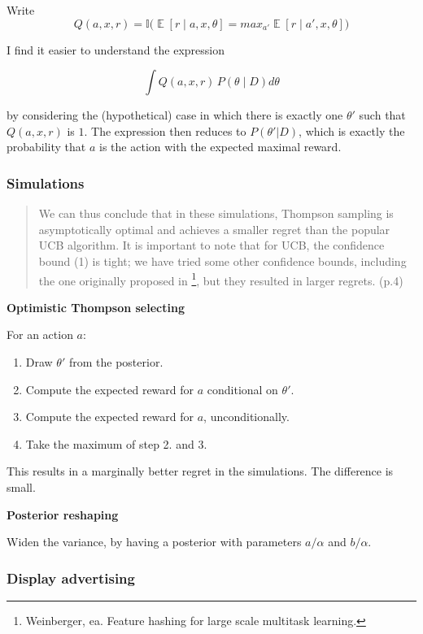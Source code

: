 \documentclass[11pt]{article}
\newcommand{\E}[1]{\operatorname{\mathbb{E}}[#1]}
\begin{document}
Write
\[
Q(a, x, r) = \mathbb{I}\Big(\E{r \mid a, x, \theta} = max_{a'} \E{r \mid a', x, \theta}\Big)
\]

I find it easier to understand the expression

\[
\int Q(a, x, r) \, P(\theta \mid D) d\theta
\]

by considering the (hypothetical) case in which there is exactly one $\theta'$
such that $Q(a, x, r)$ is $1$. The expression then reduces to $P(\theta' | D)$,
which is exactly the probability that $a$ is the action with the expected
maximal reward.

\subsubsection{Simulations}
\label{sec-2-1-3}

\begin{quote}
We can thus conclude that in these simulations, Thompson sampling is
asymptotically optimal and achieves a smaller regret than the popular UCB
algorithm. It is important to note that for UCB, the confidence bound (1) is
tight; we have tried some other confidence bounds, including the one originally
proposed in \footnote{Weinberger, ea. Feature hashing for large scale multitask learning.}, but they resulted in larger regrets. (p.4)
\end{quote}

\textbf{Optimistic Thompson selecting}

For an action $a$:

\begin{enumerate}
\item Draw $\theta'$ from the posterior.
\item Compute the expected reward for $a$ conditional on $\theta'$.
\item Compute the expected reward for $a$, unconditionally.
\item Take the maximum of step 2. and 3.
\end{enumerate}

This results in a marginally better regret in the simulations. The difference is
small.

\textbf{Posterior reshaping}

Widen the variance, by having a posterior with parameters $a/\alpha$ and $b / \alpha$.

\subsubsection{Display advertising}
\label{sec-2-1-4}
\end{document}
